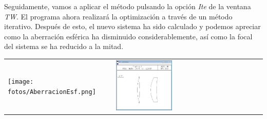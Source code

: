 \documentclass[11pt]{article}
\begin{document}
        \noindent Seguidamente, vamos a aplicar el método pulsando la opción \textit{Ite} de la ventana \textit{TW}. El programa ahora realizará la optimización a través de un método iterativo. Después de esto, el nuevo sistema ha sido calculado y podemos apreciar como la aberración esférica ha disminuido considerablemente, así como la focal del sistema se ha reducido a la mitad.

        \begin{tabular}{p{} p{}}
            \vspace{0pt}\hspace{-1.4cm} \texttt{[image: fotos/AberracionEsf.png]} &
            \vspace{0pt} \includegraphics[width=0.39\textwidth]{fotos/AberraciónCorregida.png}
        \end{tabular}
        
\end{document}
